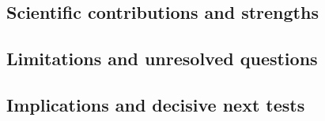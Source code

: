\subsection{Scientific contributions and strengths}

\subsection{Limitations and unresolved questions}

\subsection{Implications and decisive next tests}
